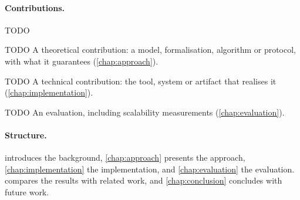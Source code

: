 \paragraph{Contributions.}
TODO
\begin{contributions}
  \item\label{c:method} TODO A theoretical contribution: a model, formalisation, algorithm or protocol, with what it guarantees (\cref{chap:approach}).
  \item\label{c:impl} TODO A technical contribution: the tool, system or artifact that realises it (\cref{chap:implementation}).
  \item\label{c:eval} TODO An evaluation, including scalability measurements (\cref{chap:evaluation}).
\end{contributions}

\paragraph{Structure.}
 introduces the background, \cref{chap:approach} presents the approach, \cref{chap:implementation} the implementation, and \cref{chap:evaluation} the evaluation.  compares the results with related work, and \cref{chap:conclusion} concludes with future work.
